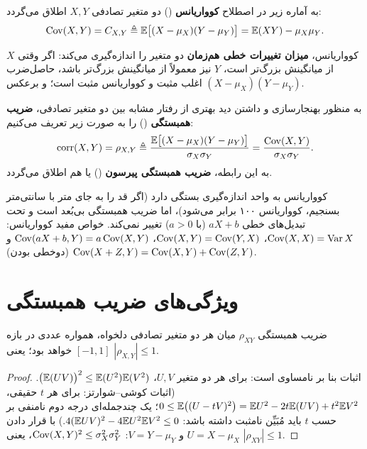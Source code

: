 \begin{definition}[کوواریانس]
به آماره زیر در اصطلاح \textbf{کوواریانس} (\textcolor{red!70!black}{}) دو متغیر تصادفی $X,Y$ اطلاق می‌گردد:
\[
\operatorname{Cov}(X,Y)=C_{X,Y}\triangleq\mathbb{E}\big[(X-\mu_X)(Y-\mu_Y)\big]=\mathbb{E}(XY)-\mu_X\mu_Y .
\]
\end{definition}
کوواریانس، \textbf{میزان تغییرات خطی هم‌زمان} دو متغیر را اندازه‌گیری می‌کند: اگر وقتی $X$ از میانگینش بزرگ‌تر است، $Y$ نیز معمولاً از میانگینش بزرگ‌تر باشد، حاصل‌ضرب $(X-\mu_X)(Y-\mu_Y)$ اغلب مثبت و کوواریانس مثبت است؛ و برعکس.

\begin{definition}
به منظور بهنجارسازی و داشتن دید بهتری از رفتار مشابه بین دو متغیر تصادفی، \textbf{ضریب همبستگی} (\textcolor{red!70!black}{}) را به صورت زیر تعریف می‌کنیم:
\[
\mathrm{corr}(X,Y)=\rho_{X,Y}\triangleq\frac{\mathbb{E}\big[(X-\mu_X)(Y-\mu_Y)\big]}{\sigma_X\sigma_Y}=\frac{\operatorname{Cov}(X,Y)}{\sigma_X\sigma_Y}.
\]
به این رابطه، \textbf{ضریب همبستگی پیرسون} () یا  هم اطلاق می‌گردد.
\end{definition}

\begin{note}
\notetitle کوواریانس به واحد اندازه‌گیری بستگی دارد (اگر قد را به جای متر با سانتی‌متر بسنجیم، کوواریانس ۱۰۰ برابر می‌شود)، اما ضریب همبستگی بی‌بُعد است و تحت تبدیل‌های خطی $aX+b$ (با $a>0$) تغییر نمی‌کند. خواص مفید کوواریانس: $\operatorname{Cov}(X,X)=\operatorname{Var} X$، $\operatorname{Cov}(X,Y)=\operatorname{Cov}(Y,X)$، $\operatorname{Cov}(aX+b,Y)=a\operatorname{Cov}(X,Y)$ و $\operatorname{Cov}(X+Z,Y)=\operatorname{Cov}(X,Y)+\operatorname{Cov}(Z,Y)$ (دوخطی بودن).
\end{note}

\section{ویژگی‌های ضریب همبستگی}

\begin{theorem}
ضریب همبستگی $\rho_{XY}$ میان هر دو متغیر تصادفی دلخواه، همواره عددی در بازه $[-1,1]$ خواهد بود؛ یعنی $|\rho_{X,Y}|\le1$.
\end{theorem}
\begin{proof}
اثبات بنا بر نامساوی  است: برای هر دو متغیر $U,V$، $\big(\mathbb{E}(UV)\big)^2\le\mathbb{E}(U^2)\mathbb{E}(V^2)$. (اثبات کوشی--شوارتز: برای هر $t$ حقیقی، $0\le\mathbb{E}\big((U-tV)^2\big)=\mathbb{E} U^2-2t\mathbb{E}(UV)+t^2\mathbb{E} V^2$؛ یک چندجمله‌ای درجه دوم نامنفی بر حسب $t$ باید مُبَیِّن نامثبت داشته باشد: $4(\mathbb{E} UV)^2-4\mathbb{E} U^2\mathbb{E} V^2\le0$.) با قرار دادن $U=X-\mu_X$ و $V=Y-\mu_Y$:
$\operatorname{Cov}(X,Y)^2\le\sigma_X^2\sigma_Y^2$، یعنی $|\rho_{XY}|\le1$.
\end{proof}

